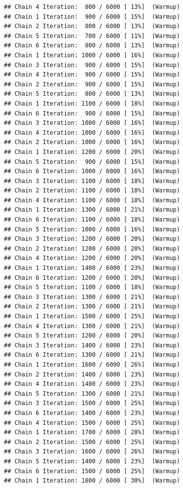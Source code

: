 \documentclass[
]{article}
\begin{document}
\begin{verbatim}
## Chain 4 Iteration:  800 / 6000 [ 13%]  (Warmup) 
## Chain 1 Iteration:  900 / 6000 [ 15%]  (Warmup) 
## Chain 2 Iteration:  800 / 6000 [ 13%]  (Warmup) 
## Chain 5 Iteration:  700 / 6000 [ 11%]  (Warmup) 
## Chain 6 Iteration:  800 / 6000 [ 13%]  (Warmup) 
## Chain 1 Iteration: 1000 / 6000 [ 16%]  (Warmup) 
## Chain 3 Iteration:  900 / 6000 [ 15%]  (Warmup) 
## Chain 4 Iteration:  900 / 6000 [ 15%]  (Warmup) 
## Chain 2 Iteration:  900 / 6000 [ 15%]  (Warmup) 
## Chain 5 Iteration:  800 / 6000 [ 13%]  (Warmup) 
## Chain 1 Iteration: 1100 / 6000 [ 18%]  (Warmup) 
## Chain 6 Iteration:  900 / 6000 [ 15%]  (Warmup) 
## Chain 3 Iteration: 1000 / 6000 [ 16%]  (Warmup) 
## Chain 4 Iteration: 1000 / 6000 [ 16%]  (Warmup) 
## Chain 2 Iteration: 1000 / 6000 [ 16%]  (Warmup) 
## Chain 1 Iteration: 1200 / 6000 [ 20%]  (Warmup) 
## Chain 5 Iteration:  900 / 6000 [ 15%]  (Warmup) 
## Chain 6 Iteration: 1000 / 6000 [ 16%]  (Warmup) 
## Chain 3 Iteration: 1100 / 6000 [ 18%]  (Warmup) 
## Chain 2 Iteration: 1100 / 6000 [ 18%]  (Warmup) 
## Chain 4 Iteration: 1100 / 6000 [ 18%]  (Warmup) 
## Chain 1 Iteration: 1300 / 6000 [ 21%]  (Warmup) 
## Chain 6 Iteration: 1100 / 6000 [ 18%]  (Warmup) 
## Chain 5 Iteration: 1000 / 6000 [ 16%]  (Warmup) 
## Chain 3 Iteration: 1200 / 6000 [ 20%]  (Warmup) 
## Chain 2 Iteration: 1200 / 6000 [ 20%]  (Warmup) 
## Chain 4 Iteration: 1200 / 6000 [ 20%]  (Warmup) 
## Chain 1 Iteration: 1400 / 6000 [ 23%]  (Warmup) 
## Chain 6 Iteration: 1200 / 6000 [ 20%]  (Warmup) 
## Chain 5 Iteration: 1100 / 6000 [ 18%]  (Warmup) 
## Chain 3 Iteration: 1300 / 6000 [ 21%]  (Warmup) 
## Chain 2 Iteration: 1300 / 6000 [ 21%]  (Warmup) 
## Chain 1 Iteration: 1500 / 6000 [ 25%]  (Warmup) 
## Chain 4 Iteration: 1300 / 6000 [ 21%]  (Warmup) 
## Chain 5 Iteration: 1200 / 6000 [ 20%]  (Warmup) 
## Chain 3 Iteration: 1400 / 6000 [ 23%]  (Warmup) 
## Chain 6 Iteration: 1300 / 6000 [ 21%]  (Warmup) 
## Chain 1 Iteration: 1600 / 6000 [ 26%]  (Warmup) 
## Chain 2 Iteration: 1400 / 6000 [ 23%]  (Warmup) 
## Chain 4 Iteration: 1400 / 6000 [ 23%]  (Warmup) 
## Chain 5 Iteration: 1300 / 6000 [ 21%]  (Warmup) 
## Chain 3 Iteration: 1500 / 6000 [ 25%]  (Warmup) 
## Chain 6 Iteration: 1400 / 6000 [ 23%]  (Warmup) 
## Chain 4 Iteration: 1500 / 6000 [ 25%]  (Warmup) 
## Chain 1 Iteration: 1700 / 6000 [ 28%]  (Warmup) 
## Chain 2 Iteration: 1500 / 6000 [ 25%]  (Warmup) 
## Chain 3 Iteration: 1600 / 6000 [ 26%]  (Warmup) 
## Chain 5 Iteration: 1400 / 6000 [ 23%]  (Warmup) 
## Chain 6 Iteration: 1500 / 6000 [ 25%]  (Warmup) 
## Chain 1 Iteration: 1800 / 6000 [ 30%]  (Warmup) 

\end{verbatim}
\end{document}
